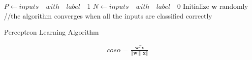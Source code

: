\documentclass[serif, aspectratio=169]{beamer}
\begin{document}
\begin{frame}
	\begin{columns}

		\begin{overlayarea}{\textwidth}{\textheight}
			\begin{center}
				\begin{algorithm}[H]
					$P \leftarrow inputs\quad with \quad label \quad 1$\;
					$N \leftarrow inputs \quad with \quad label \quad 0$\;
					Initialize $\mathbf{w}$ randomly\;
					//the algorithm converges when all the inputs are classified correctly
					\caption{Perceptron Learning Algorithm}
				\end{algorithm}
				\vspace{-0.2in}

				\scriptsize{
					\begin{align*}
						cos \alpha = \frac{\mathbf{w}^T\mathbf{x}}{||\mathbf{w}||||\mathbf{x}||}
					\end{align*}
				}

			\end{center}

		\end{overlayarea}


\end{columns}
\end{frame}
\end{document}

